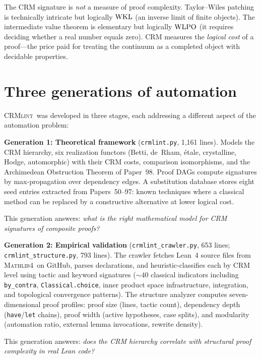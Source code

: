 \documentclass[11pt,a4paper]{article}
\theoremstyle{plain}
\theoremstyle{definition}
\newcommand{\WKL}{\textup{WKL}}
\newcommand{\WLPO}{\textup{WLPO}}
\newcommand{\CRMlint}{\textsc{CRMlint}}
\newcommand{\Mathlib}{\textsc{Mathlib4}}
\begin{document}
The CRM signature is \emph{not} a measure of proof complexity.
Taylor--Wiles patching is technically intricate but logically $\WKL$
(an inverse limit of finite objects).  The intermediate value theorem
is elementary but logically $\WLPO$ (it requires deciding whether a
real number equals zero).  CRM measures the \emph{logical cost} of a
proof---the price paid for treating the continuum as a completed object
with decidable properties.

\section{Three generations of automation}\label{sec:three-gen}

\CRMlint\ was developed in three stages, each addressing a different
aspect of the automation problem:

\medskip
\noindent\textbf{Generation 1: Theoretical framework}
(\texttt{crmlint.py}, 1{,}161 lines).
Models the CRM hierarchy, six realization functors (Betti, de~Rham,
\'etale, crystalline, Hodge, automorphic) with their CRM costs,
comparison isomorphisms, and the Archimedean Obstruction Theorem of
Paper~98.  Proof DAGs compute signatures by max-propagation over
dependency edges.  A substitution database stores eight seed entries
extracted from Papers~50--97: known techniques where a classical method
can be replaced by a constructive alternative at lower logical cost.

This generation answers: \emph{what is the right mathematical model
for CRM signatures of composite proofs?}

\medskip
\noindent\textbf{Generation 2: Empirical validation}
(\texttt{crmlint\_crawler.py}, 653 lines;
\texttt{crmlint\_structure.py}, 793 lines).
The crawler fetches Lean~4 source files from \Mathlib\ on GitHub,
parses declarations, and heuristic-classifies each by CRM level using
tactic and keyword signatures (${\sim}40$ classical indicators including
\texttt{by\_contra}, \texttt{Classical.choice}, inner product space
infrastructure, integration, and topological convergence patterns).
The structure analyzer computes seven-dimensional proof profiles:
proof size (lines, tactic count), dependency depth (\texttt{have}/\texttt{let}
chains), proof width (active hypotheses, case splits), and modularity
(automation ratio, external lemma invocations, rewrite density).

This generation answers: \emph{does the CRM hierarchy correlate with
structural proof complexity in real Lean code?}
\end{document}
